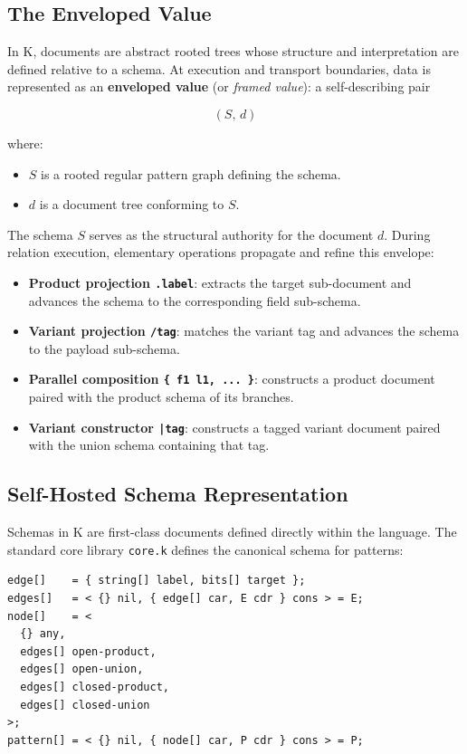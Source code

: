 \documentclass[11pt,a4paper]{article}
\begin{document}
\subsection{The Enveloped Value}

In K, documents are abstract rooted trees whose structure and interpretation are defined relative to a schema. At execution and transport boundaries, data is represented as an \textbf{enveloped value} (or \emph{framed value}): a self-describing pair

\begin{equation}
(S,\, d)
\end{equation}

\noindent where:
\begin{itemize}
  \item $S$ is a rooted regular pattern graph defining the schema.
  \item $d$ is a document tree conforming to $S$.
\end{itemize}

The schema $S$ serves as the structural authority for the document $d$. During relation execution, elementary operations propagate and refine this envelope:
\begin{itemize}
  \item \textbf{Product projection \texttt{.label}}: extracts the target sub-document and advances the schema to the corresponding field sub-schema.
  \item \textbf{Variant projection \texttt{/tag}}: matches the variant tag and advances the schema to the payload sub-schema.
  \item \textbf{Parallel composition \texttt{\{ f1 l1, ... \}}}: constructs a product document paired with the product schema of its branches.
  \item \textbf{Variant constructor \texttt{|tag}}: constructs a tagged variant document paired with the union schema containing that tag.
\end{itemize}

\subsection{Self-Hosted Schema Representation}

Schemas in K are first-class documents defined directly within the language. The standard core library \texttt{core.k} defines the canonical schema for patterns:

\begin{lstlisting}[language=k]
edge[]    = { string[] label, bits[] target };
edges[]   = < {} nil, { edge[] car, E cdr } cons > = E;
node[]    = <
  {} any,
  edges[] open-product,
  edges[] open-union,
  edges[] closed-product,
  edges[] closed-union
>;
pattern[] = < {} nil, { node[] car, P cdr } cons > = P;
\end{lstlisting}
\end{document}
